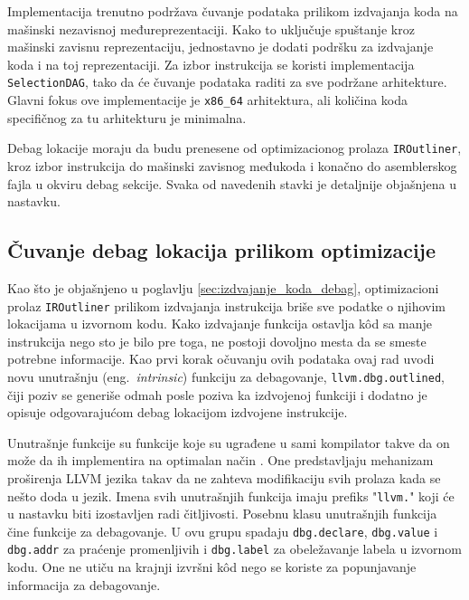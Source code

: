 \documentclass[12pt,oneside]{memoir}
\begin{document}
Implementacija trenutno podržava čuvanje podataka prilikom izdvajanja koda na mašinski nezavisnoj međureprezentaciji.
Kako to uključuje spuštanje kroz mašinski zavisnu reprezentaciju, jednostavno je dodati podršku za izdvajanje koda i na toj reprezentaciji.
Za izbor instrukcija se koristi implementacija \verb|SelectionDAG|, tako da će čuvanje podataka raditi za sve podržane arhitekture.
Glavni fokus ove implementacije je \verb|x86_64| arhitektura, ali količina koda specifičnog za tu arhitekturu je minimalna.

Debag lokacije moraju da budu prenesene od optimizacionog prolaza \verb|IROutliner|, kroz izbor instrukcija do mašinski zavisnog međukoda i konačno do asemblerskog fajla u okviru debag sekcije.
Svaka od navedenih stavki je detaljnije objašnjena u nastavku.

\subsection{Čuvanje debag lokacija prilikom optimizacije}

Kao što je objašnjeno u poglavlju \ref{sec:izdvajanje_koda_debag},
optimizacioni prolaz \verb|IROutliner| prilikom izdvajanja instrukcija briše sve podatke o njihovim lokacijama u izvornom kodu.
Kako izdvajanje funkcija ostavlja k\^od sa manje instrukcija nego sto je bilo pre toga, ne postoji dovoljno mesta da se smeste potrebne informacije.
Kao prvi korak očuvanju ovih podataka ovaj rad uvodi novu unutrašnju (eng.~{\em intrinsic}) funkciju za debagovanje, \verb|llvm.dbg.outlined|, čiji poziv se generiše odmah posle poziva ka izdvojenoj funkciji i dodatno je opisuje odgovarajućom debag lokacijom izdvojene instrukcije.

Unutrašnje funkcije su funkcije koje su ugrađene u sami kompilator takve da on može da ih implementira na optimalan način \cite{sarda2015llvm_essentials}.
One predstavljaju mehanizam proširenja LLVM jezika takav da ne zahteva modifikaciju svih prolaza kada se nešto doda u jezik.
Imena svih unutrašnjih funkcija imaju prefiks "\verb|llvm.|" koji će u nastavku biti izostavljen radi čitljivosti.
Posebnu klasu unutrašnjih funkcija čine funkcije za debagovanje.
U ovu grupu spadaju \verb|dbg.declare|, \verb|dbg.value| i \verb|dbg.addr| za praćenje promenljivih i \verb|dbg.label| za obeležavanje labela u izvornom kodu.
One ne utiču na krajnji izvršni k\^od nego se koriste za popunjavanje informacija za debagovanje.
\end{document}
